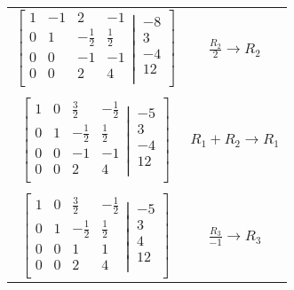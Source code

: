 \documentclass{article}
\begin{document}
\begin{table}[h]
\begin{tabular}{c|c}
$\left[
  \begin{matrix}
    1 & -1 & 2 & -1\\  
 0 & 1 & -\frac{1}{2} & \frac{1}{2}\\
 0 & 0 & -1 & -1\\
 0 & 0 & 2 & 4 \\
  \end{matrix}
  \left|
    \,
    \begin{matrix}
      -8  \\
      3  \\
      -4  \\
      12  \\
    \end{matrix}
  \right.
\right]$ & $ \frac{R_{2}}{2}  \rightarrow R_{2}$

\\
\\

$\left[
  \begin{matrix}
    1 & 0 & \frac{3}{2}  & -\frac{1}{2}\\  
 0 & 1 & -\frac{1}{2} & \frac{1}{2}\\
 0 & 0 & -1 & -1\\
 0 & 0 & 2 & 4 \\
  \end{matrix}
  \left|
    \,
    \begin{matrix}
      -5  \\
      3  \\
      -4  \\
      12  \\
    \end{matrix}
  \right.
\right]$ & $ R_{1} + R_{2}  \rightarrow R_{1}$

\\
\\

$\left[
  \begin{matrix}
    1 & 0 & \frac{3}{2}  & -\frac{1}{2}\\  
 0 & 1 & -\frac{1}{2} & \frac{1}{2}\\
 0 & 0 & 1 & 1\\
 0 & 0 & 2 & 4 \\
  \end{matrix}
  \left|
    \,
    \begin{matrix}
      -5  \\
      3  \\
      4  \\
      12  \\
    \end{matrix}
  \right.
\right]$ & $ \frac{R_{3}}{-1}  \rightarrow R_{3}$


\end{tabular}
\end{table}
\end{document}
